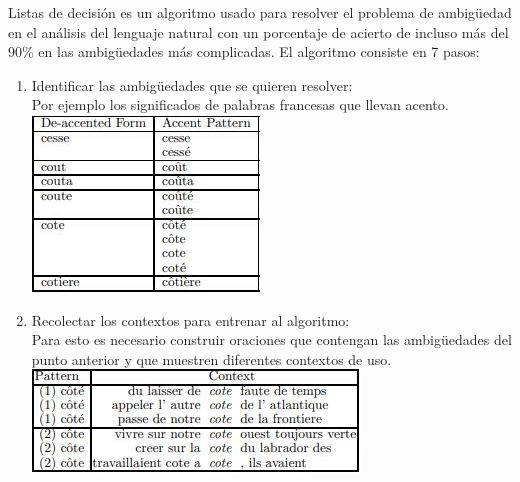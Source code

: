 Listas de decisión es un algoritmo usado para resolver el problema de ambigüedad en el análisis del lenguaje natural con un porcentaje de acierto de incluso más del 90\% en las ambigüedades más complicadas. El algoritmo consiste en 7 pasos:\cite{DecisionLists}
\begin{enumerate}
    \item Identificar las ambigüedades que se quieren resolver:\\
    Por ejemplo los significados de palabras francesas que llevan acento. \cite{DecisionLists}\\ \includegraphics[]{img/listas/Listas_decision1.JPG}
    
    \item Recolectar los contextos para entrenar al algoritmo:\\
    Para esto es necesario construir oraciones que contengan las ambigüedades del punto anterior y que muestren diferentes contextos de uso. \cite{DecisionLists}\\
    \includegraphics[]{img/listas/Listas_decision2.JPG}
    

\end{enumerate}
